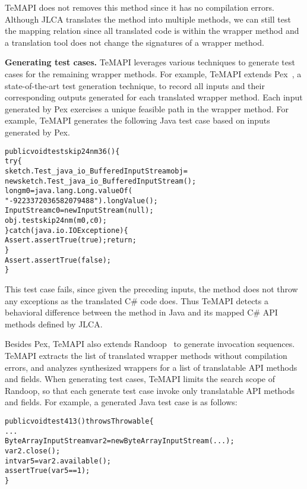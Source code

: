 TeMAPI does not removes this method since it has no compilation errors. Although JLCA translates the  method into multiple methods, we can still test the mapping relation since all translated code is within the wrapper method and a translation tool does not change the signatures of a wrapper method.

\textbf{Generating test cases.} TeMAPI leverages various techniques to generate test cases for the remaining wrapper methods. For example, TeMAPI extends Pex~\cite{tillmann2008pex}, a state-of-the-art test generation technique, to record all inputs and their corresponding outputs generated for each translated wrapper method. Each input generated by Pex exercises a unique feasible path in the wrapper method. For example, TeMAPI generates the following Java test case based on inputs generated by Pex.

\begin{CodeOut}\vspace*{-1ex}
\begin{alltt}
public void testskip24nm36()\{
  try\{
     sketch.Test_java_io_BufferedInputStream obj =
        new sketch.Test_java_io_BufferedInputStream();
     long m0 = java.lang.Long.valueOf(
                  "-9223372036582079488").longValue();
     InputStream c0 = new InputStream(null);
     obj.testskip24nm(m0,c0);
  \}catch(java.io.IOException e)\{
     Assert.assertTrue(true);return;
  \}
  Assert.assertTrue(false);
\}
\end{alltt}
\end{CodeOut}\vspace*{-2ex}

This test case fails, since given the preceding inputs, the  method does not throw any exceptions as the translated C\# code does. Thus TeMAPI detects a behavioral difference between the  method in Java and its mapped C\# API methods defined by JLCA.

Besides Pex, TeMAPI also extends Randoop~\cite{pacheco2007feedback} to generate invocation sequences. TeMAPI extracts the list of translated wrapper methods without compilation errors, and analyzes synthesized wrappers for a list of translatable API methods and fields. When generating test cases, TeMAPI limits the search scope of Randoop, so that each generate test case invoke only translatable API methods and fields. For example, a generated Java test case is as follows:

\begin{CodeOut}\vspace*{-1ex}
\begin{alltt}
public void test413() throws Throwable\{
  ...
  ByteArrayInputStream var2=new ByteArrayInputStream(...);
  var2.close();
  int var5=var2.available();
  assertTrue(var5 == 1);
\}
\end{alltt}
\end{CodeOut}\vspace*{-2ex}


